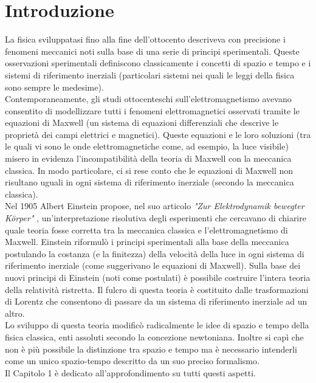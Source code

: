 \chapter*{Introduzione}   
La fisica sviluppatasi fino alla fine dell'ottocento descriveva con precisione i fenomeni meccanici noti sulla base di una serie di principi sperimentali. Queste osservazioni sperimentali definiscono classicamente i concetti di spazio e tempo e i sistemi di riferimento inerziali (particolari sistemi nei quali le leggi della fisica sono sempre le medesime).\\
Contemporaneamente, gli studi ottocenteschi sull'elettromagnetismo avevano consentito di modellizzare tutti i fenomeni elettromagnetici osservati tramite le equazioni di Maxwell (un sistema di equazioni differenziali che descrive le proprietà dei campi elettrici e magnetici). Queste equazioni e le loro soluzioni (tra le quali vi sono le onde elettromagnetiche come, ad esempio, la luce visibile) misero in evidenza l'incompatibilità della teoria di Maxwell con la meccanica classica. In modo particolare, ci si rese conto che le equazioni di Maxwell non risultano uguali in ogni sistema di riferimento inerziale (secondo la meccanica classica).\\
Nel 1905 Albert Einstein propose, nel suo articolo \emph{"Zur Elektrodynamik bewegter Körper"} \cite{Einstein1905}, un'interpretazione risolutiva degli esperimenti che cercavano di chiarire quale teoria fosse corretta tra la meccanica classica e l'elettromagnetismo di Maxwell. Einstein riformulò i principi sperimentali alla base della meccanica postulando la costanza (e la finitezza) della velocità della luce in ogni sistema di riferimento inerziale (come suggerivano le equazioni di Maxwell). Sulla base dei nuovi principi di Einstein (noti come postulati) è possibile costruire l'intera teoria della relatività ristretta. Il fulcro di questa teoria è costituito dalle trasformazioni di Lorentz che consentono di passare da un sistema di riferimento inerziale ad un altro.\\
Lo sviluppo di questa teoria modificò radicalmente le idee di spazio e tempo della fisica classica, enti assoluti secondo la concezione newtoniana. Inoltre si capì che non è più possibile la distinzione tra spazio e tempo ma è necessario intenderli come un unico spazio-tempo descritto da un suo preciso formalismo.\\
Il Capitolo 1 è dedicato all'approfondimento su tutti questi aspetti.\\

